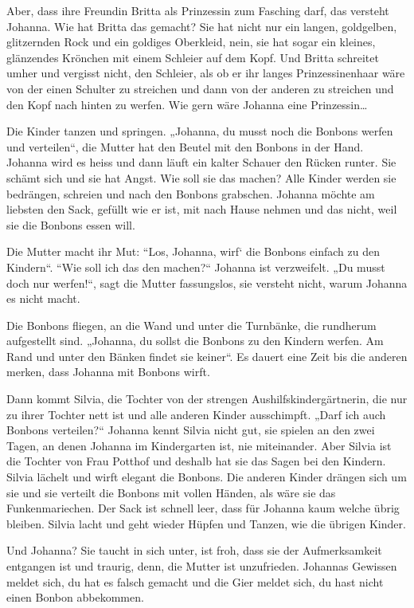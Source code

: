 \documentclass[10pt,titlepage,a5paper]{book}
\begin{document}
Aber, dass ihre Freundin Britta als Prinzessin zum Fasching darf, das versteht Johanna. Wie hat Britta das gemacht? Sie hat  nicht nur ein langen, goldgelben, glitzernden Rock und ein goldiges Oberkleid, nein, sie hat sogar ein kleines, glänzendes Krönchen mit einem Schleier auf dem Kopf. Und Britta schreitet umher und vergisst nicht, den Schleier, als ob er ihr langes Prinzessinenhaar wäre von der einen Schulter zu streichen und dann von der anderen zu streichen und den Kopf nach hinten zu werfen. Wie gern wäre Johanna eine Prinzessin\dots

Die Kinder tanzen und springen. „Johanna, du musst noch die Bonbons werfen und verteilen“, die Mutter hat den Beutel mit den Bonbons in der Hand. Johanna wird es heiss und dann läuft ein kalter Schauer den Rücken runter. Sie schämt sich und sie hat Angst. Wie soll sie das machen? Alle Kinder werden sie bedrängen, schreien und nach den Bonbons grabschen. Johanna möchte am liebsten den Sack, gefüllt wie er ist, mit nach Hause nehmen und das nicht, weil sie die Bonbons essen will. 

Die Mutter macht ihr Mut: “Los, Johanna, wirf` die Bonbons einfach zu den Kindern“. “Wie soll ich das den machen?“ Johanna ist verzweifelt.  „Du musst doch nur werfen!“, sagt die Mutter fassungslos, sie versteht nicht, warum Johanna es nicht macht. 

Die Bonbons fliegen, an die Wand und unter die Turnbänke, die rundherum aufgestellt sind. „Johanna, du sollst die Bonbons zu den Kindern werfen. Am Rand und unter den Bänken findet sie keiner“. Es dauert eine Zeit bis die anderen merken, dass Johanna mit Bonbons wirft. 

Dann kommt Silvia, die Tochter von der strengen Aushilfskinder\-gärtnerin, die nur zu ihrer Tochter nett ist und alle anderen Kinder ausschimpft. „Darf ich auch Bonbons verteilen?“ Johanna kennt Silvia nicht gut, sie spielen an den zwei Tagen, an denen Johanna im Kindergarten ist, nie miteinander. Aber Silvia ist die Tochter von Frau Potthof und deshalb hat sie das Sagen bei den Kindern.  Silvia lächelt und wirft elegant die Bonbons. Die anderen Kinder drängen sich um sie und sie verteilt die Bonbons mit vollen Händen, als wäre sie das Funkenmariechen. Der Sack ist schnell leer, dass für Johanna kaum welche übrig bleiben. Silvia lacht und geht wieder Hüpfen und Tanzen, wie die übrigen Kinder. 

Und Johanna? Sie taucht in sich unter, ist froh, dass sie der Aufmerksamkeit entgangen ist und traurig, denn, die Mutter ist unzufrieden. Johannas Gewissen meldet sich, du hat es falsch gemacht und die Gier meldet sich, du hast nicht einen Bonbon abbekommen. 
\end{document}
